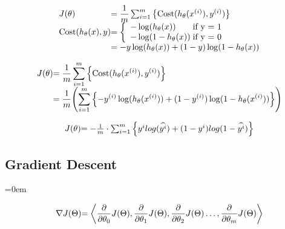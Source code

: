 	\[
	\begin{array}{ l@{} l@{} } 
	J(\theta)
	& =
	\dfrac{1}{m}
	\sum_{i=1}^m
	\left\{
		\mathrm{Cost}(h_\theta(x^{(i)}),y^{(i)})
	\right\} 
	\\ 
	\mathrm{Cost}(h_\theta(x),y)
	& =
	\left\{ 
		\begin{array}{ l@{} l@{} } 
			-\log(h_\theta(x))
			\;
			& \text{if y = 1} 
			\\ 
			-\log(1-h_\theta(x))
			\;
			& \text{if y = 0} 
		\end{array}
	\right.  
	\\ 
	& = 
	-y\log(h_\theta(x))
	+
	(1-y)\log(1-h_\theta(x)) 
	\end{array}
\]


\[
	\begin{array}{ l@{} l@{} } 
	J(\theta)
	& =
	{ \displaystyle 
		\dfrac{1}{m}
		\sum_{i=1}^m
		\left\{
			\mathrm{Cost}(h_\theta(x^{(i)}),y^{(i)})
		\right\}
	}
	\\ 
	& =
	\dfrac{1}{m} 
	{ \displaystyle 
		\left(
			\sum_{i=1}^m
			\left\{
				-y^{(i)}\log(h_\theta(x^{(i)}))
				+
				(1-y^{(i)})\log(1-h_\theta(x^{(i)}))
			\right\}
		\right)
	} 
	\end{array}
\]

\[
	\begin{array}{ l@{} l@{} } 
		J(\theta)
		& =
		-
		\frac{1}{m}
		\cdot
		\sum_{i=1}^{m}
		\left\{
			y^{i}
			log(\widehat{y^{i}})
			+
			(1 - y^{i})
			log(1-\widehat{y^{i}})
		\right\}
	\end{array}
\]

\pagebreak
\subsectionend
\subsection{Gradient Descent}
\label{ssec:gradient_descent}
\parindent=0em

\[
	\begin{array}{ l@{} l@{} }
		\nabla J(\Theta)
		& =
		\left\langle
		  {\displaystyle \frac{\partial}{\partial \theta_0} J(\Theta)}
		, {\displaystyle \frac{\partial}{\partial \theta_1} J(\Theta)}
		, {\displaystyle \frac{\partial}{\partial \theta_2} J(\Theta)}
		\ldots
		, {\displaystyle \frac{\partial}{\partial \theta_m} J(\Theta)}
		\right\rangle
		\\
	\end{array}
\]


